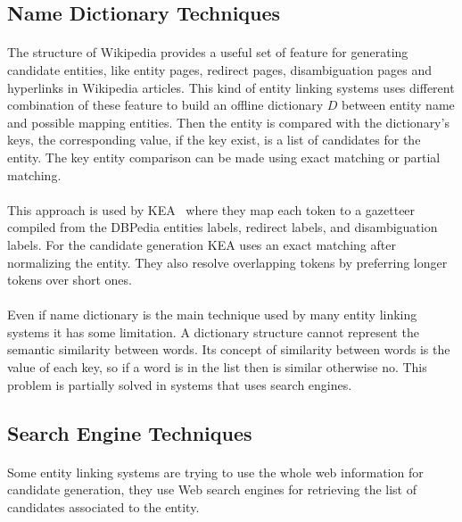 \subsection{Name Dictionary Techniques}
\paragraph{}
The structure of Wikipedia provides a useful set of feature for generating candidate entities, like entity pages, redirect pages, disambiguation pages and hyperlinks in Wikipedia articles. This kind of entity linking systems uses different combination of these feature to build an offline dictionary $D$ between entity name and possible mapping entities. Then the entity is compared with the dictionary's keys, the corresponding value, if the key exist, is a list of candidates for the entity. The key entity comparison can be made using exact matching or partial matching. 

\paragraph{}
This approach is used by KEA~\cite{waitelonisnamed} where they map each token to a gazetteer compiled from the DBPedia entities labels, redirect labels, and disambiguation labels. For the candidate generation KEA uses an exact matching  after normalizing the entity. They also resolve overlapping tokens by preferring longer tokens over short ones.

\paragraph{}
Even if name dictionary is the main technique used by many entity linking systems it has some limitation. A dictionary structure cannot represent the semantic similarity between words. Its concept of similarity between words is the value of each key, so if a word is in the list then is similar otherwise no. This problem is partially solved in systems that uses search engines.

\subsection{Search Engine Techniques}
\paragraph{}
Some entity linking systems are trying to use the whole web information for candidate generation, they use Web search engines for retrieving the list of candidates associated to the entity.

